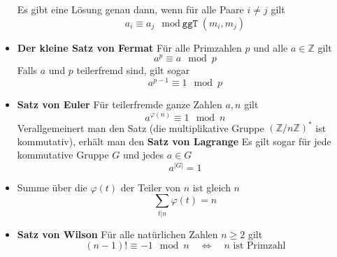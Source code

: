 \documentclass[landscape, 8pt, a4paper]{extarticle}
\newcommand{\ggT}{\texttt{ggT}}
\newcommand{\Z}{\mathbb{Z}}
\begin{document}
\begin{multicols}{3}
\begin{itemize}
		Es gibt eine Lösung genau dann, wenn für alle Paare $i\neq j$ gilt
		\begin{equation*}
			a_i\equiv a_j\mod \ggT(m_i,m_j)
		\end{equation*}

		\item \textbf{Der kleine Satz von Fermat} Für alle Primzahlen $p$ und alle $a\in\Z$ gilt
		\begin{equation*}
			a^p\equiv a\mod p
		\end{equation*}
		Falls $a$ und $p$ teilerfremd sind, gilt sogar
		\begin{equation*}
			a^{p-1}\equiv 1\mod p
		\end{equation*}

		\item \textbf{Satz von Euler} Für teilerfremde ganze Zahlen $a,n$ gilt
		\begin{equation*}
			a^{\varphi(n)}\equiv 1 \mod n
		\end{equation*}
		Verallgemeinert man den Satz (die multiplikative Gruppe $(\Z/n\Z)^\ast$ ist kommutativ), erhält man den \textbf{Satz von Lagrange} Es gilt sogar für jede kommutative Gruppe $G$ und jedes $a\in G$ 
		\begin{equation*}
		 	a^{|G|}=1
		\end{equation*} 

		\item Summe über die $\varphi(t)$ der Teiler von $n$ ist gleich $n$
		\begin{equation*}
			\sum_{t|n}\varphi(t)=n
		\end{equation*}

		\item \textbf{Satz von Wilson} Für alle natürlichen Zahlen $n\geq 2$ gilt
		\begin{equation*}
			(n-1)!\equiv -1\mod n\quad\Leftrightarrow\quad n \text{ ist Primzahl}
		\end{equation*}
	\end{itemize}



\end{multicols}
\end{document}
